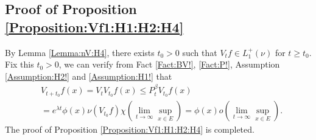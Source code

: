 \documentclass[12pt,a4paper]{amsart}
\numberwithin{equation}{section}
\theoremstyle{plain}
\theoremstyle{definition}
\theoremstyle{remark}
\begin{document}
\subsection{Proof of Proposition \ref{Proposition:Vf1:H1:H2:H4}}
By Lemma \ref{Lemma:nV:H4}, there exists $t_0>0$ such that $V_tf \in L_1^+(\nu)$ for $t\geq t_0$. 
Fix this $t_0>0$, we can verify from Fact \ref{Fact:BV!}, \ref{Fact:P!}, Assumption \ref{Assumption:H2!} and \ref{Assumption:H1!} that
\begin{align}
 &V_{t+t_0}f (x) 
 = V_tV_{t_0}f(x)
 \leq P_t^\beta V_{t_0} f(x)
 \\&= e^{\lambda t}\phi(x) \nu( V_{t_0} f) \chi(\lim_{t\to \infty} \sup_{x\in E})
 = \phi(x) o(\lim_{t\to \infty}\sup_{x\in E}).
 \end{align}
The proof of Proposition \ref{Proposition:Vf1:H1:H2:H4} is completed.
\end{document}
